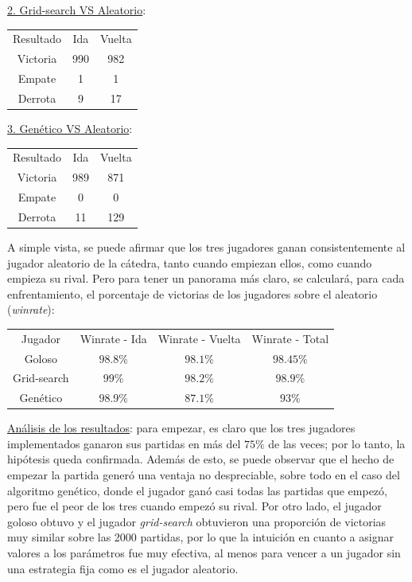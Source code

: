\documentclass[12pt,a4paper]{article}
\begin{document}
    \underline{2. Grid-search VS Aleatorio}:
    \begin{center}
		\begin{tabular}{ | c || c | c | }
		\hline
		Resultado &  Ida &  Vuelta \\ \hhline{|=#=|=|}
		    Victoria &  990 &  982 \\ \hline
		    Empate &  1 &  1 \\ \hline
		    Derrota &  9 &  17 \\ \hline
		\end{tabular}
    \end{center}
    
    \underline{3. Genético VS Aleatorio}:
    \begin{center}
		\begin{tabular}{ | c || c | c | }
		\hline
		Resultado &  Ida &  Vuelta \\ \hhline{|=#=|=|}
		    Victoria &  989 &  871 \\ \hline
		    Empate &  0 &  0 \\ \hline
		    Derrota &  11 &  129 \\ \hline
		\end{tabular}
    \end{center}
    
    A simple vista, se puede afirmar que los tres jugadores ganan consistentemente al jugador aleatorio de la cátedra, tanto cuando empiezan ellos, como cuando empieza su rival. Pero para tener un panorama más claro, se calculará, para cada enfrentamiento, el porcentaje de victorias de los jugadores sobre el aleatorio (\textit{winrate}):
    
    \begin{center}
		\begin{tabular}{ | c || c | c | c |}
		\hline
		Jugador &  Winrate - Ida &  Winrate - Vuelta &  Winrate - Total \\ \hhline{|=#=|=|=|}
		    Goloso &  $98.8\%$ &  $98.1\%$ &  $98.45\%$ \\ \hline
		    Grid-search &  $99\%$ &  $98.2\%$ &  $98.9\%$  \\ \hline
		    Genético &  $98.9\%$ &  $87.1\%$ &  $93\%$ \\ \hline
		\end{tabular}
    \end{center}
    
    \underline{Análisis de los resultados}: para empezar, es claro que los tres jugadores implementados ganaron sus partidas en más del $75\%$ de las veces; por lo tanto, la hipótesis queda confirmada. Además de esto, se puede observar que el hecho de empezar la partida generó una ventaja no despreciable, sobre todo en el caso del algoritmo genético, donde el jugador ganó casi todas las partidas que empezó, pero fue el peor de los tres cuando empezó su rival. Por otro lado, el jugador goloso obtuvo y el jugador \textit{grid-search} obtuvieron una proporción de victorias muy similar sobre las 2000 partidas, por lo que la intuición en cuanto a asignar valores a los parámetros fue muy efectiva, al menos para vencer a un jugador sin una estrategia fija como es el jugador aleatorio.
    
\end{document}
